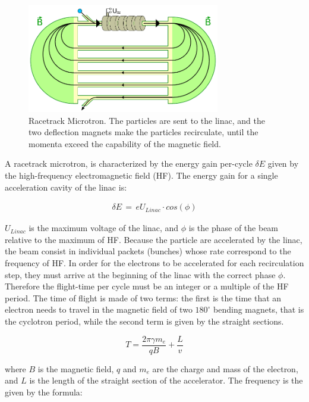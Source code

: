 \begin{figure}[hbtp]

\centering
\includegraphics[width = 0.75\textwidth]{ExperimentalSetup/RacetrackMicrotronSketch.pdf}
\caption{Racetrack Microtron. The particles are sent to the linac, and the two deflection magnets make the particles recirculate, until the momenta exceed the capability of the magnetic field.}
\label{fig:RaceTrackSketch}
\end{figure}

A racetrack microtron, is characterized by the energy gain per-cycle $\delta E$ given by the high-frequency electromagnetic field (HF). The energy gain for a single acceleration cavity of the linac is: 

\begin{align*}
\delta E \, = \, e U_{Linac} \cdot cos(\phi)
\end{align*} 

$U_{Linac}$ is the maximum voltage of the linac, and $\phi$ is the phase of the beam relative to the maximum of HF. Because the particle are accelerated by the linac, the beam consist in individual packets (bunches) whose rate correspond to the frequency of HF. In order for the electrons to be accelerated for each recirculation step, they must arrive at the beginning of the linac with the correct phase $\phi$. Therefore the flight-time per cycle must be an integer or a multiple of the HF period. The time of flight is made of two terms: the first is the time that an electron needs to travel in the magnetic field of two $180^{\circ}$ bending magnets, that is the cyclotron period, while the second term is given by the straight sections. 

\begin{equation} \label{eq:TimeofFlight}
T = \dfrac{2 \pi \gamma m_{e} }{qB} + \dfrac{L}{v}
\end{equation}

where $B$ is the magnetic field, $q$ and $m_{e}$ are the charge and mass of the electron, and $L$ is the length of the straight section of the accelerator. The frequency is the given by the formula:

